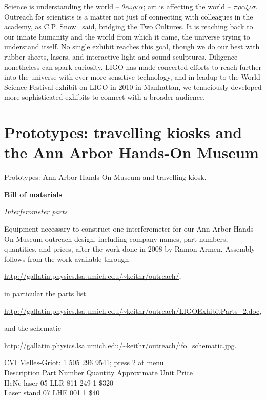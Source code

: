 
Science is understanding the world -- $\theta \epsilon \omega \rho \iota \alpha $; art is affecting the world -- $ \pi \rho \alpha \xi \iota \sigma $.
Outreach for scientists is a matter not just of connecting with colleagues in the academy, as C.P. Snow~\cite{SnowTwoCultures} said, bridging the Two Cultures.
It is reaching back to our innate humanity and the world from which it came, the universe trying to understand itself. 
No single exhibit reaches this goal, though we do our best with rubber sheets, lasers, and interactive light and sound sculptures. 
Diligence nonetheless can spark curiosity.
LIGO has made concerted efforts to reach further into the universe with ever more sensitive technology, and in leadup to the World Science Festival exhibit on LIGO in 2010 in Manhattan, we tenaciously developed more sophisticated exhibits to connect with a broader audience. 

    \section{Prototypes: travelling kiosks and the Ann Arbor Hands-On Museum} 
    \label{prototypes}

        Prototypes: Ann Arbor Hands-On Museum and travelling kiosk.

    \textbf{Bill of materials}

\textit{Interferometer parts}

Equipment necessary to construct one interferometer for our Ann Arbor Hands-On
Museum outreach design, including company names, part numbers, quantities, and
prices, after the work done in 2008 by Ramon Armen. Assembly follows from the
work available through

\url{http://gallatin.physics.lsa.umich.edu/~keithr/outreach/}, 

in particular the parts list 

\url{http://gallatin.physics.lsa.umich.edu/~keithr/outreach/LIGOExhibitParts_2.doc},

and the schematic 

\url{http://gallatin.physics.lsa.umich.edu/~keithr/outreach/ifo_schematic.jpg}.

CVI Melles-Griot: 1 505 296 9541; press 2 at menu \\
Description     Part Number     Quantity   Approximate Unit Price\\
HeNe laser      05 LLR 811-249  1          \$320 \\
Laser stand     07 LHE 001      1          \$40 \\

